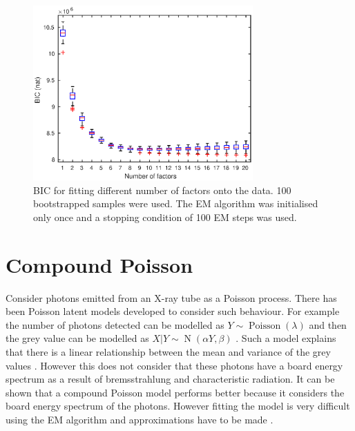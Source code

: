 \documentclass[12pt]{report}
\DeclareMathOperator{\normal}{N}
\DeclareMathOperator{\poisson}{Poisson}
\begin{document}
\begin{figure}
	\centering
	\includegraphics[width=0.75\textwidth]{figures/initial_factor_BIC_bootstrap.eps}
	\caption{BIC for fitting different number of factors onto the data. 100 bootstrapped samples were used. The EM algorithm was initialised only once and a stopping condition of 100 EM steps was used.}
	\label{fig:initial_factor_BIC_bootstrap}
\end{figure}

\section{Compound Poisson}
Consider photons emitted from an X-ray tube as a Poisson process. There has been Poisson latent models developed to consider such behaviour. For example the number of photons detected can be modelled as $Y\sim\poisson(\lambda)$ and then the grey value can be modelled as $X|Y\sim\normal(\alpha Y,\beta)$ \cite{jin2014investigating}. Such a model explains that there is a linear relationship between the mean and variance of the grey values \cite{jin2014investigating}. However this does not consider that these photons have a board energy spectrum as a result of bremsstrahlung and characteristic radiation. It can be shown that a compound Poisson model performs better \cite{whiting2006properties} because it considers the board energy spectrum of the photons. However fitting the model is very difficult using the EM algorithm and approximations have to be made \cite{xie2008x}.
\end{document}
